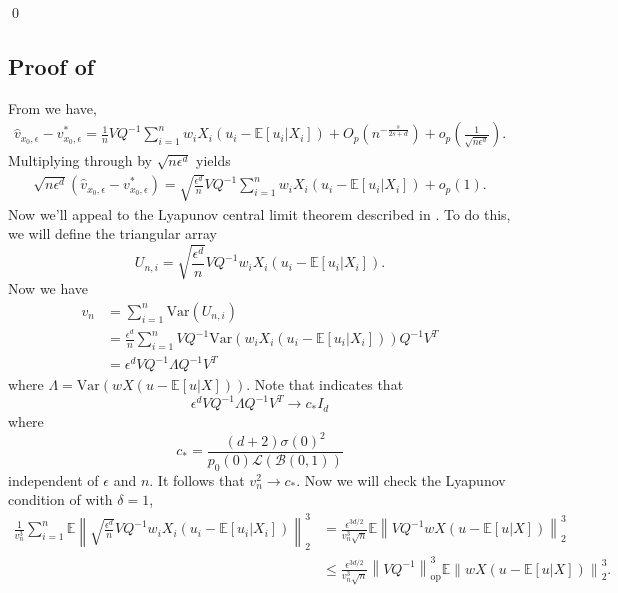 \documentclass[11pt]{article}
\begin{document}
\qed{}



\subsection{Proof of } \label{sec: proof of central limit for v}
From  we have, 
\begin{align*}
    \hat{v}_{x_0, \epsilon} - v^*_{x_0, \epsilon} = \frac{1}{n}VQ^{-1}\sum_{i = 1}^nw_iX_i(u_i - \mathbb{E}[u_i|X_i]) 
    + O_p\left(n^{-\frac{s}{2s+d}}\right) + o_p\left(\frac{1}{\sqrt{n\epsilon^d}}\right).
\end{align*}
Multiplying through by $\sqrt{n\epsilon^{d}}$ yields
\begin{align*}
    \sqrt{n\epsilon^{d}}(\hat{v}_{x_0, \epsilon} - v^*_{x_0, \epsilon}) = \sqrt{\frac{\epsilon^{d}}{n}}VQ^{-1}\sum_{i = 1}^nw_iX_i(u_i - \mathbb{E}[u_i|X_i]) 
    + o_p\left(1\right).
\end{align*}
Now we'll appeal to the Lyapunov central limit theorem described in . To do this, we will define the triangular array
\[U_{n, i} = \sqrt{\frac{\epsilon^{d}}{n}}VQ^{-1}w_iX_i(u_i - \mathbb{E}[u_i|X_i]).\]
Now we have
\begin{align*}
    v_n &= \sum_{i = 1}^n\text{Var}(U_{n, i}) \\
    &= \frac{\epsilon^d}{n}\sum_{i = 1}^nVQ^{-1}\text{Var}(w_iX_i(u_i - \mathbb{E}[u_i|X_i]))Q^{-1}V^T \tag{independence} \\
    &= \epsilon^dVQ^{-1}\Lambda Q^{-1}V^T \tag{identically distributed for fixed $n$}
\end{align*}
where $\Lambda = \text{Var}(wX(u - \mathbb{E}[u|X]))$. Note that  indicates that
\[\epsilon^dVQ^{-1}\Lambda Q^{-1}V^T \rightarrow  c_*I_d \]
where
\[c_* = \frac{(d+2)\sigma(0)^2}{p_0(0)\mathcal{L}(\mathcal{B}(0,1))}\]
independent of $\epsilon$ and $n$. It follows that $v_n^2 \rightarrow c_*$. Now we will check the Lyapunov condition of  with $\delta = 1$,
\begin{align*}
     \frac{1}{v_n^{3}}\sum_{i = 1}^n\mathbb{E}\left\|\sqrt{\frac{\epsilon^{d}}{n}}VQ^{-1}w_iX_i(u_i - \mathbb{E}[u_i|X_i])\right\|_2^3 &= \frac{\epsilon^{3d/2}}{v_n^3\sqrt{n}}\mathbb{E}\left\|VQ^{-1}wX(u - \mathbb{E}[u|X])\right\|_2^3 \\
     &\leq \frac{\epsilon^{3d/2}}{v_n^3\sqrt{n}}\left\|VQ^{-1}\right\|_{\text{op}}^3\mathbb{E}\left\|wX(u - \mathbb{E}[u|X])\right\|_2^3.
\end{align*}
\end{document}
